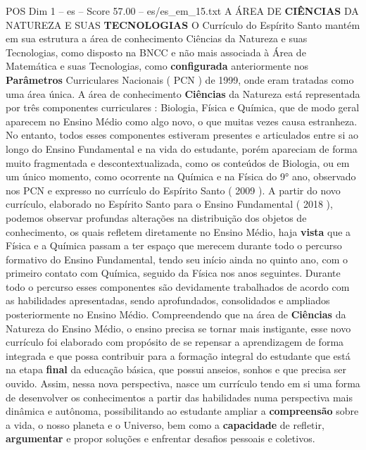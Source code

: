 \begin{textsample}{POS Dim 1 – es – Score 57.00 – es/es\_em\_15.txt}  \label{ex:f1_pos_193}
A ÁREA DE \textbf{CIÊNCIAS} DA NATUREZA E SUAS \textbf{TECNOLOGIAS} O Currículo do Espírito Santo mantém em sua estrutura a área de conhecimento Ciências da Natureza e suas Tecnologias, como disposto na BNCC e não mais associada à Área de Matemática e suas Tecnologias, como \textbf{configurada} anteriormente nos \textbf{Parâmetros} Curriculares Nacionais ( PCN ) de 1999, onde eram tratadas como uma área única.
A área de conhecimento \textbf{Ciências} da Natureza está representada por três componentes curriculares : Biologia, Física e Química, que de modo geral aparecem no Ensino Médio como algo novo, o que muitas vezes causa estranheza.
No entanto, todos esses componentes estiveram presentes e articulados entre si ao longo do Ensino Fundamental e na vida do estudante, porém apareciam de forma muito fragmentada e descontextualizada, como os conteúdos de Biologia, ou em um único momento, como ocorrente na Química e na Física do 9{\EmojiFont °} ano, observado nos PCN e expresso no currículo do Espírito Santo ( 2009 ).
A partir do novo currículo, elaborado no Espírito Santo para o Ensino Fundamental ( 2018 ), podemos observar profundas alterações na distribuição dos objetos de conhecimento, os quais refletem diretamente no Ensino Médio, haja \textbf{vista} que a Física e a Química passam a ter espaço que merecem durante todo o percurso formativo do Ensino Fundamental, tendo seu início ainda no quinto ano, com o primeiro contato com Química, seguido da Física nos anos seguintes.
Durante todo o percurso esses componentes são devidamente trabalhados de acordo com as habilidades apresentadas, sendo aprofundados, consolidados e ampliados posteriormente no Ensino Médio.
Compreendendo que na área de \textbf{Ciências} da Natureza do Ensino Médio, o ensino precisa se tornar mais instigante, esse novo currículo foi elaborado com propósito de se repensar a aprendizagem de forma integrada e que possa contribuir para a formação integral do estudante que está na etapa \textbf{final} da educação básica, que possui anseios, sonhos e que precisa ser ouvido.
Assim, nessa nova perspectiva, nasce um currículo tendo em si uma forma de desenvolver os conhecimentos a partir das habilidades numa perspectiva mais dinâmica e autônoma, possibilitando ao estudante ampliar a \textbf{compreensão} sobre a vida, o nosso planeta e o Universo, bem como a \textbf{capacidade} de refletir, \textbf{argumentar} e propor soluções e enfrentar desafios pessoais e coletivos.

\end{textsample}
